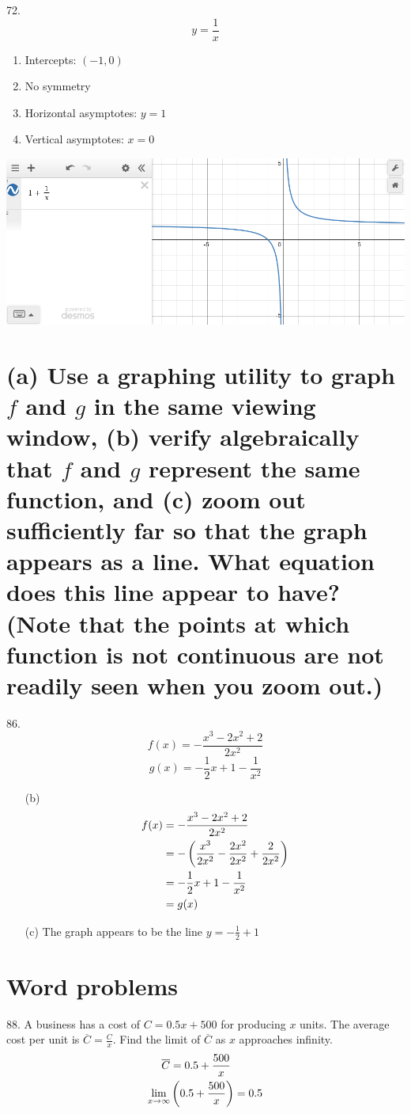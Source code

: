 \documentclass[11pt]{article}
\newcommand*{\set}{\setcounter{equation}{0}}
\begin{document}
72.\[y=\frac{1}{x}\]
\begin{enumerate}
    \item Intercepts: $(-1, 0)$
    \item No symmetry
    \item Horizontal asymptotes: $y=1$
    \item Vertical asymptotes: $x=0$
\end{enumerate}
\includegraphics[scale=0.5]{72.png}

\section{(a) Use a graphing utility to graph $f$ and $g$ in the same viewing window, (b) verify algebraically that $f$ and $g$ represent the same function, and (c) zoom out sufficiently far so that the graph appears as a line. What equation does this line appear to have? (Note that the points at which function is not continuous are not readily seen when you zoom out.)}
86.\[f(x)=-\frac{x^3-2x^2+2}{2x^2}\]
\[g(x)=-\frac{1}{2}x+1-\frac{1}{x^2}\]
\begin{enumerate}
    \item[(b)] \begin{align}
        \set
        f(x)&=-\frac{x^3-2x^2+2}{2x^2}\\
        &=-\left(\frac{x^3}{2x^2}-\frac{2x^2}{2x^2}+\frac{2}{2x^2}\right)\\
        &=-\frac{1}{2}x+1-\frac{1}{x^2}\\
        &=g(x)
    \end{align}
    \item[(c)] The graph appears to be the line $y=-\frac{1}{2}+1$
\end{enumerate}

\section{Word problems}
88. A business has a cost of $C=0.5x+500$ for producing $x$ units. The average cost per unit is $\overline{C}=\frac{C}{x}$. Find the limit of $\overline{C}$ as $x$ approaches infinity.
\begin{align}
    \set
    \overline{C}&=0.5+\frac{500}{x}\\
    \lim_{x\to\infty}&\left(0.5+\frac{500}{x}\right)=0.5
\end{align}
\end{document}

